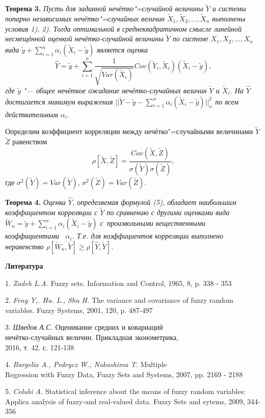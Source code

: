 \textbf{Теорема 3.} \textit{Пусть для заданной нечётко"=случайной
величины $\tilde{Y}$ и системы попарно независимых
нечётко"=случайных величин $\tilde{X}_1, \tilde{X}_2,..., \tilde{X}_n$ выполнены условия 1), 2). Тогда оптимальной в среднеквадратичном смысле линейной несмещённой оценкой нечётко-случайной величины $\tilde{Y}$ по системе $X_1, X_2,..., X_n$ вида $\tilde{y}+\sum\limits_{i=1}^n\alpha_i(\tilde{X}_i - \tilde{y})$ является оценка }
\begin{equation}
\hat{Y} = \tilde{y} + \sum\limits_{i=1}^n\frac{1}{\sqrt{Var(\tilde{X}_i)}}Cov(\tilde{Y}_i, \tilde{X}_i)(\tilde{X}_i-\tilde{y}),
\end{equation}
\textit{где $\tilde{y}$ "--- общее нечёткое ожидание нечётко-случайных величин $\tilde{Y}$ и $\tilde{X}_i$. На $\hat{Y}$ достигается минимум выражения $||\tilde{Y} - \tilde{y} -\sum\limits_{i=1}^n\alpha_i(\tilde{X}_i-\tilde{y})||_{\omega}^2$ по всем действительным $\alpha_i$.}

Определим коэффициент корреляции между нечётко"=случайными величинами $\tilde{Y}$ $\tilde{Z}$ равенством
$$
\rho[\tilde{X}, \tilde{Z}] = \frac{Cov(\tilde{X}, \tilde{Z})}{\sigma(\tilde{Y})\sigma(\tilde{Z})},
$$
где $\sigma^2(\tilde{Y}) = Var(\tilde{Y})$, $\sigma^2(\tilde{Z}) = Var(\tilde{Z})$.

\textbf{Теорема 4.} \textit{Оценка $\hat{Y}$, определяемая формулой (5),
обладает наибольшим коэффициентом корреляции с $\tilde{Y}$
по сра\-в\-не\-нию с другими оценками вида $\tilde{W}_n = \tilde{y} + \sum\limits_{i=1}^n\alpha_i(\tilde{X}_i - \tilde{y})$
с~произвольными вещественными коэффициентами ~$\alpha_i$.
\linebreak
Т.е. для коэффициентов корреляции выполнено неравенство
\linebreak
$\rho[\tilde{W}_n, \tilde{Y}]\geq \rho[\hat{Y},\tilde{Y}] $. }

\smallskip \centerline {\bf Литература} \nopagebreak

1. {\it Zadeh L.A.} Fuzzy sets. Information and Control, 1965, 8, p. 338 - 353

2. {\it Feng Y,. Hu. L., Shu H.} The variance and covariance of fuzzy random variables. Fuzzy Systems,
2001, 120, p. 487-497

3. {\it Шведов А.С.} Оценивание средних и ковариаций
\\нечётко-случайных величин. Прикладная эконометрика,
\\2016, т. 42. с. 121-138

4. {\it Bargelia A., Pedrycz W., Nakashima T.} Multiple
\\Regression with Fuzzy Data, Fuzzy Sets and Systems, 2007, pp. 2169 - 2188

5. {\it Colubi A.} Statistical inference about the means of fuzzy random variables: Applica analysis of fuzzy-and real-valued data. Fuzzy Sets and sytems, 2009, 344-356
